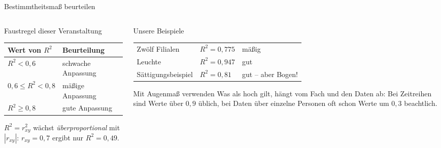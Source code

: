 \documentclass[aspectratio=169,11pt]{beamer}
\begin{document}
\begin{frame}{Bestimmtheitsmaß beurteilen}
  \begin{columns}[T]
    \begin{column}{0.46\textwidth}
      \begin{block}{Faustregel dieser Veranstaltung}
        \begin{center}
          \renewcommand{\arraystretch}{1.2}
          \begin{tabular}{ll}
            \toprule
            \textbf{Wert von $R^{2}$} & \textbf{Beurteilung} \\
            \midrule
            $R^{2} < 0{,}6$           & schwache Anpassung \\
            $0{,}6 \le R^{2} < 0{,}8$ & mäßige Anpassung \\
            $R^{2} \ge 0{,}8$         & gute Anpassung \\
            \bottomrule
          \end{tabular}
        \end{center}
      \end{block}
      \small
      $R^{2} = r_{xy}^{2}$ wächst \emph{überproportional} mit $|r_{xy}|$:
      $r_{xy} = 0{,}7$ ergibt nur $R^{2} = 0{,}49$.
    \end{column}
    \begin{column}{0.52\textwidth}
      \small
      \begin{exampleblock}{Unsere Beispiele}
        \renewcommand{\arraystretch}{1.15}
        \begin{tabular}{@{}lll@{}}
          Zwölf Filialen     & $R^{2} = 0{,}775$ & mäßig \\
          Leuchte            & $R^{2} = 0{,}947$ & gut \\
          Sättigungsbeispiel & $R^{2} = 0{,}81$  & gut -- aber Bogen!
        \end{tabular}
      \end{exampleblock}
      \begin{alertblock}{Mit Augenmaß verwenden}
        Was als \glqq hoch\grqq{} gilt, hängt vom Fach und den Daten ab: Bei
        Zeitreihen sind Werte über $0{,}9$ üblich, bei Daten über einzelne
        Personen oft schon Werte um $0{,}3$ beachtlich.
      \end{alertblock}
    \end{column}
  \end{columns}
\end{frame}
\end{document}
